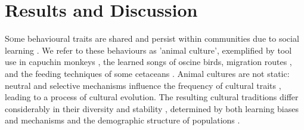 \documentclass[9pt, twocolumn, twoside]{gsajnl}
\begin{document}


\maketitle
\vspace{-13pt}%

\section{Results and Discussion}

\lettrine[lines=2]Some behavioural traits are shared and persist within communities due to social learning \parencite{viciana2021}. We refer to these behaviours as 'animal culture', exemplified by tool use in capuchin monkeys \parencite{falotico2019}, the learned songs of oscine birds, migration routes \parencite{jesmer2018, berdahl2018, byholm2022}, and the feeding techniques of some cetaceans \parencite{allen2013, rendell2001}. Animal cultures are not static: neutral and selective mechanisms influence the frequency of cultural traits \parencite{potvin2015, williams2021}, leading to a process of cultural evolution. The resulting cultural traditions differ considerably in their diversity and stability \parencite{tchernichovski2017}, determined by both learning biases and mechanisms and the demographic structure of populations \parencite{deffner2022a, kandler2017}. 
\end{document}
